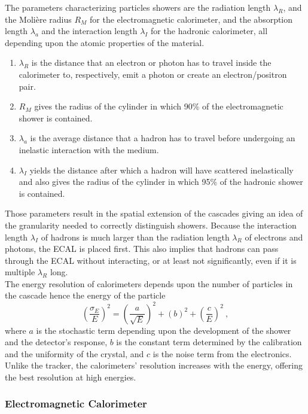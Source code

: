 			The parameters characterizing particles showers are the radiation length $ \lambda_R $, and the Molière radius $ R_M $ for the electromagnetic calorimeter, and the absorption length $ \lambda_a $ and the interaction length $ \lambda_I $ for the hadronic calorimeter, all depending upon the atomic properties of the material.
			\begin{enumerate}
				\item[] $ \lambda_R $ is the distance that an electron or photon has to travel inside the calorimeter to, respectively, emit a photon or create an electron/positron pair.
				\item[] $ R_M $ gives the radius of the cylinder in which 90\% of the electromagnetic shower is contained.
				\item[] $ \lambda_a $ is the average distance that a hadron has to travel before undergoing an inelastic interaction with the medium.
				\item[] $ \lambda_I $ yields the distance after which a hadron will have scattered inelastically and also gives the radius of the cylinder in which 95\% of the hadronic shower is contained.
			\end{enumerate}
			Those parameters result in the spatial extension of the cascades giving an idea of the granularity needed to correctly distinguish showers. Because the interaction length $ \lambda_I $ of hadrons is much larger than the radiation length $ \lambda_R $ of electrons and photons, the ECAL is placed first. This also implies that hadrons can pass through the ECAL without interacting, or at least not significantly, even if it is multiple $ \lambda_R $ long. \\

			The energy resolution of calorimeters depends upon the number of particles in the cascade hence the energy of the particle
			\begin{equation}
				\left( \frac{\sigma_E}{E} \right)^2 = \left( \frac{a}{\sqrt{E}} \right)^2 + \left( b \right)^2 + \left( \frac{c}{E} \right)^2 \ ,
			\end{equation}
			where $ a $ is the stochastic term depending upon the development of the shower and the detector's response, $ b $ is the constant term determined by the calibration and the uniformity of the crystal, and $ c $ is the noise term from the electronics. Unlike the tracker, the calorimeters' resolution increases with the energy, offering the best resolution at high energies.

			\subsubsection{Electromagnetic Calorimeter}
			\label{sec:lhc_and_cms__electromagnetic_calorimeter}

